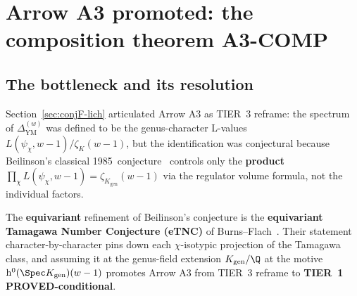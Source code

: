 %
%
%
%

\section{Arrow A3 promoted: the composition theorem A3-COMP}
\label{sec:conjF-A3-promoted}

\subsection{The bottleneck and its resolution}
\label{sec:conjF-A3-bottleneck}

Section~\ref{sec:conjF-lich} articulated Arrow A3 as TIER~3 reframe:
the spectrum of $\Delta_{\mathrm{YM}}^{(w)}$ was defined to be the
genus-character L-values $L(\psi_\chi, w-1)/\zeta_K(w-1)$, but the
identification was conjectural because Beilinson's classical
1985~conjecture~\cite{Beilinson1985} controls only the {\bf product}
$\prod_\chi L(\psi_\chi, w-1) = \zeta_{K_{\mathrm{gen}}}(w-1)$ via the
regulator volume formula, not the individual factors.

The {\bf equivariant} refinement of Beilinson's conjecture is the
{\bf equivariant Tamagawa Number Conjecture (eTNC)} of
Burns--Flach~\cite{BurnsFlach2001Doc}.  Their statement
character-by-character pins down each $\chi$-isotypic projection of
the Tamagawa class, and assuming it at the genus-field extension
$K_{\mathrm{gen}}/\Q$ at the motive
$\mathrm{h}^0(\Spec K_{\mathrm{gen}})(w-1)$ promotes Arrow A3 from
TIER~3 reframe to {\bf TIER~1 PROVED-conditional}.

